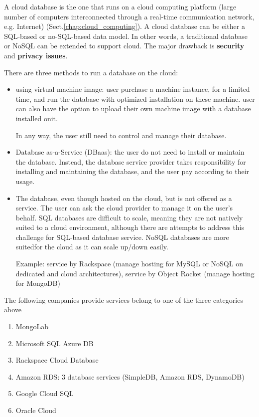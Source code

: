 A cloud database is the one that runs on a cloud computing platform (large
number of computers interconnected through a real-time communication network,
e.g. Internet) (Sect.\ref{chap:cloud_computing}). 
A cloud database can be either a SQL-based or no-SQL-based data model. In other
words, a traditional database or NoSQL can be extended to support cloud. The
major drawback is {\bf security} and {\bf privacy issues}. 


There are three methods to run a database on the cloud:
\begin{itemize}
  \item using virtual machine image: user purchase a machine instance, for a
  limited time, and run the database with optimized-installation on these
  machine. user can also have the option to upload their own machine image
  with a database installed onit.
  
  In any way, the user still need to control and manage their database.
  
  \item Database as-a-Service (DBaas): the user do not need to install or
  maintain the database. Instead, the database service provider takes
  responsibility for installing and maintaining the database, and the user pay
  according to their usage.
  
  \item The database, even though hosted on the cloud, but is not offered as a
  service. The user can ask the cloud provider to manage it on the user's
  behalf. SQL databases are difficult to scale, meaning they are not natively
  suited to a cloud environment, although there are attempts to address this
  challenge for SQL-based database service. NoSQL databases are more
  suitedfor the cloud as it can scale up/down easily.
  
  Example: service by Rackspace (manage hosting for MySQL or NoSQL on dedicated
  and cloud architectures), service by Object Rocket (manage hosting for
  MongoDB)
\end{itemize}

The following companies provide services belong to one of the three categories
above
\begin{enumerate}
  \item MongoLab
  \item Microsoft SQL Azure DB
  
  \item Rackspace Cloud Database
  \item Amazon RDS: 3 database services (SimpleDB, Amazon RDS,
  DynamoDB)
  
  \item Google Cloud SQL
  \item Oracle Cloud
  \end{enumerate}

